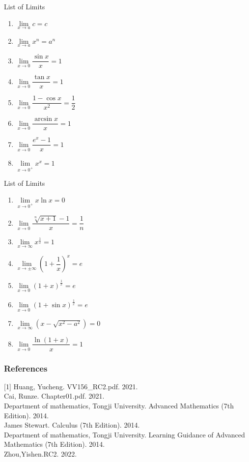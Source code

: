 \documentclass{beamer}
\begin{document}
	\begin{frame}{List of Limits}
\begin{enumerate}[1]
    \item $\lim\limits_{x \rightarrow a} c=c $
    \item $\lim\limits_{x \rightarrow a} x^{n}=a^{n}$
    \item $\lim\limits_{x \rightarrow 0} \dfrac{\sin x}{x}=1$
\item $\lim\limits_{x \rightarrow 0} \dfrac{\tan x}{x}=1$
    \item $\lim\limits_{x \rightarrow 0} \dfrac{1-\cos x}{x^{2}}=\dfrac{1}{2}$
    \item $\lim\limits_{x \rightarrow 0} \dfrac{\arcsin x}{x}=1$
    \item $\lim\limits_{x \rightarrow 0} \dfrac{e^{x}-1}{x}=1$
    \item $\lim\limits_{x \rightarrow 0^{+}} x^{x}=1$
\end{enumerate}
\end{frame}
\begin{frame}{List of Limits}
\begin{enumerate}[1]
\item $\lim\limits_{x \rightarrow 0^{+}} x \ln x=0$
    \item $\lim\limits_{x \rightarrow 0} \dfrac{\sqrt[n]{x+1}-1}{x}=\dfrac{1}{n}$
    \item $\lim\limits_{x \rightarrow \infty} x^{\frac{1}{x}}=1$
    \item $\lim\limits_{x \rightarrow \pm \infty}\left(1+\dfrac{1}{x}\right)^{x}=e$
    \item $\lim\limits_{x \rightarrow 0}(1+x)^{\frac{1}{x}}=e$
    \item $\lim\limits_{x \rightarrow 0}(1+\sin x)^{\frac{1}{x}}=e$
    \item $\lim\limits_{x \rightarrow \infty}\left(x-\sqrt{x^{2}-a^{2}}\right)=0$
\item $\lim\limits_{x \rightarrow 0} \dfrac{\ln{(1+x)} }{x}=1$
\end{enumerate}
\end{frame}
	
\begin{frame}
		\frametitle{References}
		[1] Huang, Yucheng. VV156\_RC2.pdf. 2021.\\
		\bigskip
		[2] Cai, Runze. Chapter01.pdf. 2021.\\
		\bigskip
		[3] Department of mathematics, Tongji University. Advanced Mathematics (7th Edition). 2014.\\
		\bigskip
		[4] James Stewart. Calculus (7th Edition). 2014.\\
		\bigskip
		[5] Department of mathematics, Tongji University. Learning Guidance of Advanced Mathematics (7th Edition). 2014.\\
		\bigskip
		[6]Zhou,Yishen.RC2. 2022.
\end{frame}
\end{document}
